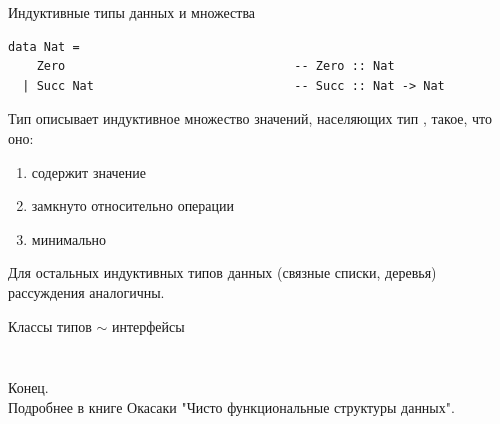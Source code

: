 \documentclass[aspectratio=169
  , xcolor={svgnames}
  , hyperref=
      { colorlinks
      , urlcolor=DarkBlue 
      }  
  , russian  %
  ]{beamer}
\theoremstyle{exerciseStyle1}
\begin{document}
\begin{frame}[fragile]{Индуктивные типы данных и множества}
\begin{verbatim}
data Nat = 
    Zero                                -- Zero :: Nat
  | Succ Nat                            -- Succ :: Nat -> Nat
\end{verbatim}
Тип  описывает индуктивное множество значений, населяющих тип , такое, что оно:
\begin{enumerate}
  \item содержит значение 
  \item замкнуто относительно операции 
  \item минимально
\end{enumerate}

Для остальных индуктивных типов данных (связные списки, деревья) рассуждения аналогичны.
\end{frame}

\begin{frame}[fragile]{Классы типов $\sim$ интерфейсы}
\begin{minipage}{.48\textwidth}
  \inputminted[firstline=9,lastline=15]{haskell}{code/Stacks.hs}
\end{minipage}
\begin{minipage}{.48\textwidth}
  \inputminted[firstline=16,lastline=26]{haskell}{code/Stacks.hs}
\end{minipage}
\end{frame}








\begin{frame}
\begin{center}
  {\Huge Конец.}\\
  
  Подробнее в книге Окасаки "Чисто функциональные структуры данных".
\end{center}
\end{frame}


\end{document}
